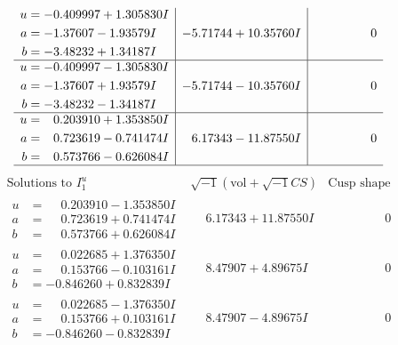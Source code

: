 \documentclass[1p]{elsarticle_modified}
\theoremstyle{definition}
\newcommand{\I}{\sqrt{-1}}
\begin{document}
$$\begin{array}{c|c|c}
\begin{aligned}
u &= -0.409997 + 1.305830 I \\
a &= -1.37607 - 1.93579 I \\
b &= -3.48232 + 1.34187 I\end{aligned}
 & -5.71744 + 10.35760 I & \phantom{-0.000000 } 0 \\ \hline\begin{aligned}
u &= -0.409997 - 1.305830 I \\
a &= -1.37607 + 1.93579 I \\
b &= -3.48232 - 1.34187 I\end{aligned}
 & -5.71744 - 10.35760 I & \phantom{-0.000000 } 0 \\ \hline\begin{aligned}
u &= \phantom{-}0.203910 + 1.353850 I \\
a &= \phantom{-}0.723619 - 0.741474 I \\
b &= \phantom{-}0.573766 - 0.626084 I\end{aligned}
 & \phantom{-}6.17343 - 11.87550 I & \phantom{-0.000000 } 0\\
 \hline 
 \end{array}$$\newpage$$\begin{array}{c|c|c}  
\text{Solutions to }I^u_{1}& \I (\text{vol} + \sqrt{-1}CS) & \text{Cusp shape}\\
 \hline 
\begin{aligned}
u &= \phantom{-}0.203910 - 1.353850 I \\
a &= \phantom{-}0.723619 + 0.741474 I \\
b &= \phantom{-}0.573766 + 0.626084 I\end{aligned}
 & \phantom{-}6.17343 + 11.87550 I & \phantom{-0.000000 } 0 \\ \hline\begin{aligned}
u &= \phantom{-}0.022685 + 1.376350 I \\
a &= \phantom{-}0.153766 - 0.103161 I \\
b &= -0.846260 + 0.832839 I\end{aligned}
 & \phantom{-}8.47907 + 4.89675 I & \phantom{-0.000000 } 0 \\ \hline\begin{aligned}
u &= \phantom{-}0.022685 - 1.376350 I \\
a &= \phantom{-}0.153766 + 0.103161 I \\
b &= -0.846260 - 0.832839 I\end{aligned}
 & \phantom{-}8.47907 - 4.89675 I & \phantom{-0.000000 } 0 \\ \hline\begin{aligned}

\end{aligned}
\end{array}$$
\end{document}
